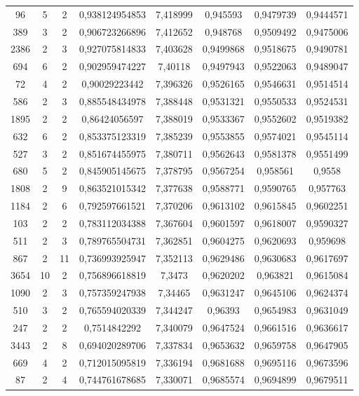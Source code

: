 \begin{longtable}{|c|c|c|c|c|c|c|c|}
96 & 5 & 2 & 0,938124954853 & 7,418999 & 0,945593 & 0,9479739 & 0,9444571 \\
389 & 3 & 2 & 0,906723266896 & 7,412652 & 0,948768 & 0,9509492 & 0,9475006 \\
2386 & 2 & 3 & 0,927075814833 & 7,403628 & 0,9499868 & 0,9518675 & 0,9490781 \\
694 & 6 & 2 & 0,902959474227 & 7,40118 & 0,9497943 & 0,9522063 & 0,9489047 \\
72 & 4 & 2 & 0,90029223442 & 7,396326 & 0,9526165 & 0,9546631 & 0,9514514 \\
586 & 2 & 3 & 0,885548434978 & 7,388448 & 0,9531321 & 0,9550533 & 0,9524531 \\
1895 & 2 & 2 & 0,86424056597 & 7,388019 & 0,9533367 & 0,9552602 & 0,9519382 \\
632 & 6 & 2 & 0,853375123319 & 7,385239 & 0,9553855 & 0,9574021 & 0,9545114 \\
527 & 3 & 2 & 0,851674455975 & 7,380711 & 0,9562643 & 0,9581378 & 0,9551499 \\
680 & 5 & 2 & 0,845905145675 & 7,378795 & 0,9567254 & 0,958561 & 0,9558 \\
1808 & 2 & 9 & 0,863521015342 & 7,377638 & 0,9588771 & 0,9590765 & 0,957763 \\
1184 & 2 & 6 & 0,792597661521 & 7,370206 & 0,9613102 & 0,9615845 & 0,9602251 \\
103 & 2 & 2 & 0,783112034388 & 7,367604 & 0,9601597 & 0,9618007 & 0,9590327 \\
511 & 2 & 3 & 0,789765504731 & 7,362851 & 0,9604275 & 0,9620693 & 0,959698 \\
867 & 2 & 11 & 0,736993925947 & 7,352113 & 0,9629486 & 0,9630683 & 0,9617697 \\
3654 & 10 & 2 & 0,756896618819 & 7,3473 & 0,9620202 & 0,963821 & 0,9615084 \\
1090 & 2 & 3 & 0,757359247938 & 7,34465 & 0,9631247 & 0,9645106 & 0,9624374 \\
510 & 3 & 2 & 0,765594020339 & 7,344247 & 0,96393 & 0,9654983 & 0,9631049 \\
247 & 2 & 2 & 0,7514842292 & 7,340079 & 0,9647524 & 0,9661516 & 0,9636617 \\
3443 & 2 & 8 & 0,694020289706 & 7,337834 & 0,9653632 & 0,9659758 & 0,9647905 \\
669 & 4 & 2 & 0,712015095819 & 7,336194 & 0,9681688 & 0,9695116 & 0,9673596 \\
87 & 2 & 4 & 0,744761678685 & 7,330071 & 0,9685574 & 0,9694899 & 0,9679511 \\

\end{longtable}
